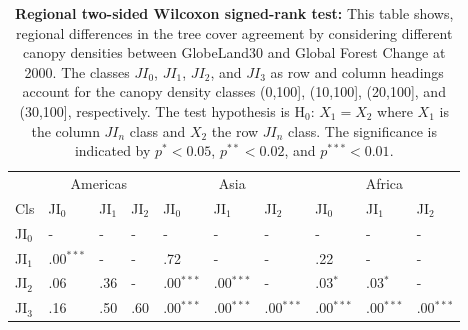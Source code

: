 			\begin{table}[ht]
				\centering
				\caption[Regional two-sided Wilcoxon signed-rank test]{\textbf{Regional two-sided Wilcoxon signed-rank test:} This table shows, regional differences in the tree cover agreement by considering different canopy densities between GlobeLand30 and Global Forest Change at 2000. The classes $JI_0$, $JI_1$, $JI_2$, and $JI_3$ as row and column headings account for the canopy density classes (0,100], (10,100], (20,100], and (30,100], respectively. The test hypothesis is H$_0$: $X_1=X_2$ where $X_1$ is the column $JI_n$ class and $X_2$ the row $JI_n$ class. The significance is indicated by $p^{*}<0.05$, $p^{**}<0.02$, and $p^{***}<0.01$.}
				\label{tab:wilcoxontwosided_regions}
				\begin{tabular}{llllllllll}
					\hline
					& \multicolumn{3}{|c}{Americas} & \multicolumn{3}{|c|}{Asia} & \multicolumn{3}{c|}{Africa} \\
					Cls & JI$_0$ & JI$_1$ & JI$_2$ & JI$_0$ & JI$_1$ & JI$_2$ & JI$_0$ & JI$_1$ & JI$_2$ \\\hline
					JI$_0$ & - & - & - & - & - & - & - & - & - \\
					JI$_1$ & .00$^{***}$ & - & - & .72 & - & - & .22 & - & - \\
					JI$_2$ & .06 & .36 & - & .00$^{***}$ & .00$^{***}$ & - & .03$^{*}$ & .03$^{*}$  & - \\
					JI$_3$ & .16 & .50 & .60 & .00$^{***}$ & .00$^{***}$ & .00$^{***}$ & .00$^{***}$ & .00$^{***}$ & .00$^{***}$ \\\hline
				\end{tabular}
			\end{table}
